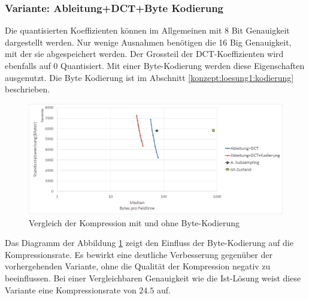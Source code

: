 \subsubsection{Variante: Ableitung+DCT+Byte Kodierung} \label{resultate:loesung1:ableitung_dct_kodierung}
Die quantisierten Koeffizienten können im Allgemeinen mit 8 Bit Genauigkeit dargestellt werden. Nur wenige Ausnahmen benötigen die 16 Big Genauigkeit, mit der sie abgespeichert werden. Der Grossteil der DCT-Koeffizienten wird ebenfalls auf 0 Quantisiert. Mit einer Byte-Kodierung werden diese Eigenschaften ausgenutzt. Die Byte Kodierung ist im Abschnitt \ref{konzept:loesung1:kodierung} beschrieben.\\
\begin{figure}[!htbp]
	\center
	\includegraphics[width=1\textwidth,keepaspectratio]{./pictures/resultate/loesung1/loesung1-6/loesung1_6.png}
	\caption{Vergleich der Kompression mit und ohne Byte-Kodierung}
	\label{resultate:loesung1:dct:kodierung}
\end{figure}
Das Diagramm der Abbildung \ref{resultate:loesung1:dct:kodierung} zeigt den Einfluss der Byte-Kodierung auf die Kompressionsrate. Es bewirkt eine deutliche Verbesserung gegenüber der vorhergehenden Variante, ohne die Qualität der Kompression negativ zu beeinflussen. Bei einer Vergleichbaren Genauigkeit wie die Ist-Lösung weist diese Variante eine Kompressionsrate von $24.5$ auf.

